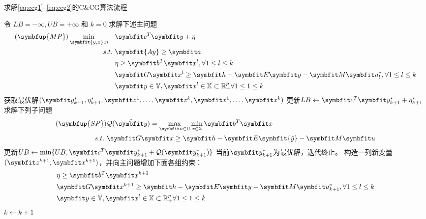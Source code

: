 \begin{algorithm}
  \caption{求解\eqref{eq:ccg1}--\eqref{eq:ccg2}的C\&CG算法流程} \label{alg:ccg}
  \small
  \begin{algorithmic}
    \STATE{} 令 $LB=-\infty, UB=+\infty$ 和 $k = 0$
    \STATE{} 求解下述主问题
    \begin{align}
      (\symbfup{MP})\min_{\symbfit{y,x},\eta}\quad & \symbfit c^T\symbfit y+\eta \\
      s.t.\ & \symbfit{Ay}\ge \symbfit a \\
      & \eta \ge \symbfit b^T\symbfit x^{l}, \forall 1\le l \le k \\
      & \symbfit G \symbfit x^l \ge \symbfit h - \symbfit E \symbfit y - \symbfit M \symbfit u_l^*, \forall 1\le l\le k \\
      &\symbfit y\in\mathbb Y, \symbfit x^l\in \mathbb X\subset\mathbb R_+^p\forall 1\le 1\le k
    \end{align}
    \STATE{} 获取最优解$(\symbfit y_{k+1}^*, \eta_{k+1}^*, \symbfit z^1, \dots, \symbfit z^k, \symbfit x^1, \dots, \symbfit x^k)$
    \STATE{} 更新$LB\leftarrow \symbfit c^T\symbfit y_{k+1}^*+\eta_{k+1}^*$
    \STATE{} 求解下列子问题
    \begin{align}
      (\symbfup{SP})& \mathcal{Q}(\hat{\symbfit y})=\max_{\symbfit u\in\mathbb U}\min_{x\in\mathbb X} \symbfit b^T\symbfit x \\
      s.t.\ & \symbfit G \symbfit x \ge \symbfit h - \symbfit E \symbfit{\hat{y}}  - \symbfit M \symbfit u
    \end{align}
    \STATE{} 更新$UB\leftarrow \min\{UB, \symbfit c^T\symbfit y_{k+1}^*+\mathcal Q(\symbfit y_{k+1}^*)\}$
        \STATE{} 当前$\symbfit y_{k+1}^*$为最优解，迭代终止。
      \ELSE[]
      \STATE{} 构造一列新变量$(\symbfit z^{k+1}, \symbfit x^{k+1})$，并向主问题增加下面各组约束：
      \begin{align}
        & \eta \ge \symbfit b^T\symbfit x^{k+1} \\
      & \symbfit G \symbfit x^{k+1} \ge \symbfit h - \symbfit E \symbfit y - \symbfit M \symbfit u_{k+1}^*, \forall 1\le l\le k \\
      &\symbfit y\in\mathbb Y, \symbfit x^l\in \mathbb X\subset\mathbb R_+^p\forall 1\le 1\le k
      \end{align}
      \STATE{} $k\leftarrow k+1$
      \ENDIF{}
    \ENDWHILE{}
  \end{algorithmic}
\end{algorithm}


